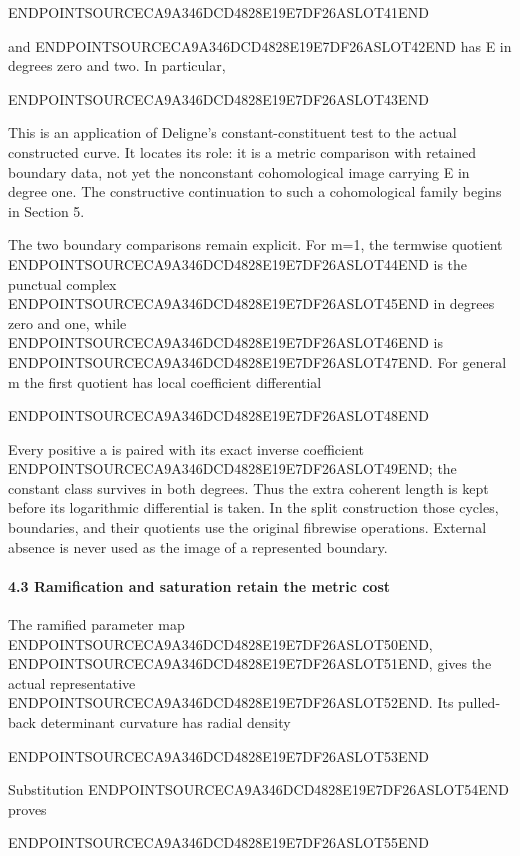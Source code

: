 ENDPOINTSOURCECA9A346DCD4828E19E7DF26ASLOT41END

and ENDPOINTSOURCECA9A346DCD4828E19E7DF26ASLOT42END has E in degrees zero and two. In particular,

ENDPOINTSOURCECA9A346DCD4828E19E7DF26ASLOT43END

This is an application of Deligne's constant-constituent test to the actual constructed curve. It locates its role: it is a metric comparison with retained boundary data, not yet the nonconstant cohomological image carrying E in degree one. The constructive continuation to such a cohomological family begins in Section 5.

The two boundary comparisons remain explicit. For m=1, the termwise quotient ENDPOINTSOURCECA9A346DCD4828E19E7DF26ASLOT44END is the punctual complex ENDPOINTSOURCECA9A346DCD4828E19E7DF26ASLOT45END in degrees zero and one, while ENDPOINTSOURCECA9A346DCD4828E19E7DF26ASLOT46END is ENDPOINTSOURCECA9A346DCD4828E19E7DF26ASLOT47END. For general m the first quotient has local coefficient differential

ENDPOINTSOURCECA9A346DCD4828E19E7DF26ASLOT48END

Every positive a is paired with its exact inverse coefficient ENDPOINTSOURCECA9A346DCD4828E19E7DF26ASLOT49END; the constant class survives in both degrees. Thus the extra coherent length is kept before its logarithmic differential is taken. In the split construction those cycles, boundaries, and their quotients use the original fibrewise operations. External absence is never used as the image of a represented boundary.

\paragraph{4.3 Ramification and saturation retain the metric cost}\label{endpoint-exponential_original--ramification-and-saturation-retain-the-metric-cost}

The ramified parameter map ENDPOINTSOURCECA9A346DCD4828E19E7DF26ASLOT50END, ENDPOINTSOURCECA9A346DCD4828E19E7DF26ASLOT51END, gives the actual representative ENDPOINTSOURCECA9A346DCD4828E19E7DF26ASLOT52END. Its pulled-back determinant curvature has radial density

ENDPOINTSOURCECA9A346DCD4828E19E7DF26ASLOT53END

Substitution ENDPOINTSOURCECA9A346DCD4828E19E7DF26ASLOT54END proves

ENDPOINTSOURCECA9A346DCD4828E19E7DF26ASLOT55END

